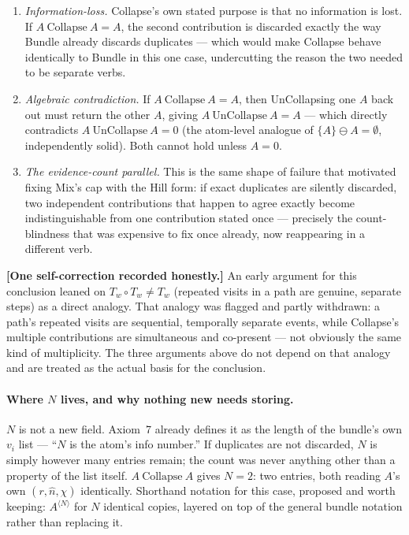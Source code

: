 \documentclass[11pt]{article}
\begin{document}
\begin{enumerate}
\item \emph{Information-loss.} Collapse's own stated purpose is that
no information is lost. If $A\ \text{Collapse}\ A=A$, the second
contribution is discarded exactly the way Bundle already discards
duplicates --- which would make Collapse behave identically to
Bundle in this one case, undercutting the reason the two needed to be
separate verbs.
\item \emph{Algebraic contradiction.} If $A\ \text{Collapse}\ A=A$,
then UnCollapsing one $A$ back out must return the other $A$, giving
$A\ \text{UnCollapse}\ A=A$ --- which directly contradicts
$A\ \text{UnCollapse}\ A=0$ (the atom-level analogue of
$\{A\}\ominus A=\emptyset$, independently solid). Both cannot hold
unless $A=0$.
\item \emph{The evidence-count parallel.} This is the same shape of
failure that motivated fixing Mix's cap with the Hill form: if exact
duplicates are silently discarded, two independent contributions that
happen to agree exactly become indistinguishable from one
contribution stated once --- precisely the count-blindness that was
expensive to fix once already, now reappearing in a different verb.
\end{enumerate}

\textbf{[One self-correction recorded honestly.]} An early argument
for this conclusion leaned on $T_w\circ T_w\neq T_w$ (repeated visits
in a path are genuine, separate steps) as a direct analogy. That
analogy was flagged and partly withdrawn: a path's repeated visits
are sequential, temporally separate events, while Collapse's multiple
contributions are simultaneous and co-present --- not obviously the
same kind of multiplicity. The three arguments above do not depend on
that analogy and are treated as the actual basis for the conclusion.

\paragraph{Where $N$ lives, and why nothing new needs storing.} $N$
is not a new field. Axiom~7 already defines it as the length of the
bundle's own $v_i$ list --- ``$N$ is the atom's info number.'' If
duplicates are not discarded, $N$ is simply however many entries
remain; the count was never anything other than a property of the
list itself. $A\ \text{Collapse}\ A$ gives $N=2$: two entries, both
reading $A$'s own $(r,\hat n,\chi)$ identically. Shorthand notation
for this case, proposed and worth keeping: $A^{\langle N\rangle}$ for
$N$ identical copies, layered on top of the general bundle notation
rather than replacing it.
\end{document}
